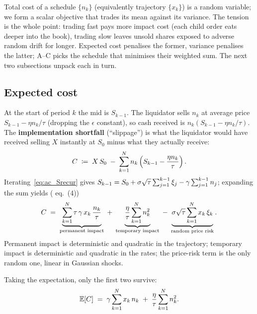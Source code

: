 Total cost of a schedule $\{n_k\}$ (equivalently trajectory
$\{x_k\}$) is a random variable; we form a scalar objective that
trades its mean against its variance. The tension is the whole
point: trading fast pays more impact cost (each child order eats
deeper into the book), trading slow leaves unsold shares exposed
to adverse random drift for longer. Expected cost penalises the
former, variance penalises the latter; A--C picks the schedule
that minimises their weighted sum. The next two subsections unpack
each in turn.

\subsection{Expected cost}
\label{subsec:ac_expectation}

At the start of period $k$ the mid is $S_{k-1}$. The liquidator
sells $n_k$ at average price $S_{k-1} - \eta n_k/\tau$ (dropping
the $\epsilon$ constant), so cash received is $n_k(S_{k-1} - \eta
n_k/\tau)$. The \textbf{implementation shortfall} (``slippage'') is
what the liquidator would have received selling $X$ instantly at
$S_0$ minus what they actually receive:
\begin{equation}
  C \;\coloneqq\; X\,S_0 \;-\; \sum_{k=1}^N n_k\left(S_{k-1} - \frac{\eta n_k}{\tau}\right).
  \label{eq:ac_cost_def}
\end{equation}
Iterating~\eqref{eq:ac_Srecur} gives $S_{k-1} = S_0 +
\sigma\sqrt\tau\sum_{j=1}^{k-1}\xi_j - \gamma\sum_{j=1}^{k-1}n_j$;
expanding the sum yields (\citeAC{} eq.~(4))
\begin{equation}
  C \;=\; \underbrace{\sum_{k=1}^N \tau\,\gamma\,x_k\,\frac{n_k}{\tau}}_{\text{permanent impact}}
       \;+\; \underbrace{\frac{\eta}{\tau}\sum_{k=1}^N n_k^2}_{\text{temporary impact}}
       \;-\; \underbrace{\sigma\sqrt{\tau}\sum_{k=1}^N x_k\,\xi_k}_{\text{random price risk}}.
  \label{eq:ac_cost_decomposed}
\end{equation}
Permanent impact is deterministic and quadratic in the trajectory;
temporary impact is deterministic and quadratic in the rates; the
price-risk term is the only random one, linear in Gaussian shocks.

Taking the expectation, only the first two survive:
\begin{equation}
  \mathbb{E}[C] \;=\; \gamma \sum_{k=1}^N x_k\,n_k
         \;+\; \frac{\eta}{\tau}\sum_{k=1}^N n_k^2.
  \label{eq:ac_EC_raw}
\end{equation}

